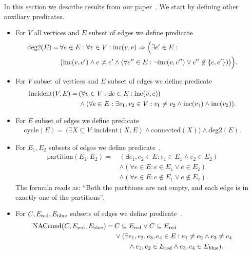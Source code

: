 In this section we describe results from our paper~\cite{my_paper}.
We start by defining other auxiliary predicates.

\begin{itemize}
	\item For \( V \) all vertices and \( E \) subset of edges we define predicate
	      \begin{align*}
		      \text{deg2}(E) = \,
		       & \forall e \in E : \forall v \in V : \text{inc} (v, e) \Rightarrow \Big( \exists e^\prime \in E : \\
		       & \big( \text{inc} (v, e^\prime) \land e \ne e^\prime \land (\forall e^{\prime\prime} \in E :
				      \lnot \text{inc} (v, e^{\prime\prime}) \lor e^{\prime\prime} \not\in \{e, e^\prime\}) \big) \Big).
	      \end{align*}
	\item For \( V \) subset of vertices and \( E \) subset of edges we define predicate
	      \begin{align*}
		      \text{incident}(V, E) = \,
		       & (\forall v \in V : \exists e \in E : \text{inc} (v, e))                                                 \\
		       & \land (\forall e \in E : \exists v_1, v_2 \in V : v_1 \ne v_2 \land \text{inc} (v_1) \land \text{inc} (v_2)).
	      \end{align*}
	\item For \( E \) subset of edges we define predicate
	      \begin{align*}
		      \text{cycle}(E) = \,
		      \big( \exists X \subseteq V : \text{incident}(X, E) \land \text{connected}(X) \big)
		      \land \text{deg2}(E).
	      \end{align*}
	\item For \( E_1, E_2 \) subsets of edges we define predicate~\cite{my_paper}.
	      \begin{align*}
		      \text{partition}(E_1, E_2) = \, & (\exists e_1, e_2 \in E : e_1 \in E_1 \land e_2 \in E_2 )    \\
		                                      & \land (\forall e \in E : e \in E_1 \lor e \in E_2 )          \\
		                                      & \land (\forall e \in E : e \not\in E_1 \lor e \not\in E_2 ).
	      \end{align*}
	      The formula reads as: ``Both the partitions are not empty,
	      and each edge is in exactly one of the partitions''.
	\item For \( C, E_{\text{red}}, E_{\text{blue}} \) subsets of edges we define predicate~\cite{my_paper}.
	      \begin{align*}
		      \text{NACcond}(C, E_{\text{red}}, E_{\text{blue}}) = \,
		       & C \subseteq E_{\text{red}} \lor C \subseteq E_{\text{red}}
		      \\
		       & \lor (\exists e_1, e_2, e_3, e_4 \in E :
		      e_1 \ne e_2 \land e_3 \ne e_4
		      \\
		       & \qquad \land e_1, e_2 \in E_{\text{red}} \land e_3, e_4 \in E_{\text{blue}} )
		      .
	      \end{align*}
\end{itemize}

